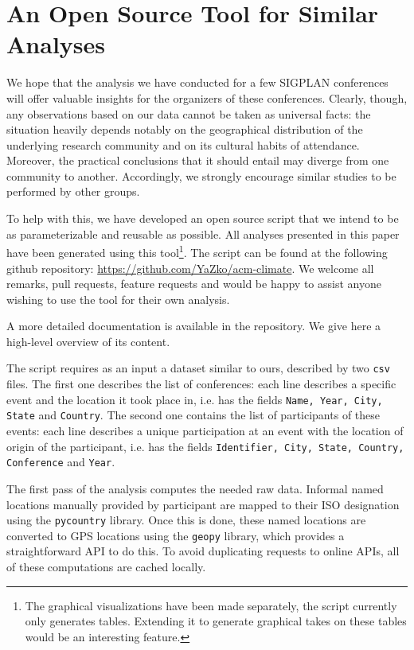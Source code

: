 \section{An Open Source Tool for Similar Analyses}
\label{sec:software}

We hope that the analysis we have conducted for a few SIGPLAN conferences
will offer valuable insights for the organizers of these conferences.
Clearly, though, any observations based on our data cannot be taken as
universal facts: the situation heavily depends notably on the geographical
distribution of the underlying research community and on its cultural habits
of attendance. Moreover, the practical conclusions that it should entail may
diverge from one community to another.  Accordingly, we strongly encourage
similar studies to be performed by other groups.

To help with this, we have developed an open source \python{} script that we
intend to be as parameterizable and reusable as possible. All analyses
presented in 
this paper have been generated using this tool\footnote{The graphical
  visualizations have been made separately, the script currently only generates
  tables. Extending it to generate graphical takes on these tables would be an
  interesting feature.}. The script can be found at the following github repository:
\url{https://github.com/YaZko/acm-climate}.
We welcome all remarks, pull requests, feature requests and would be happy to assist
anyone wishing to use the tool for their own analysis.

A more detailed documentation is available in the repository. We give here a high-level overview
of its content.

The script requires as an input a dataset similar to ours, described by two
\texttt{csv} files. The first one describes the list of conferences: each line
describes a specific event and the location it took place in, i.e. has the
fields \texttt{Name, Year, City, State} and \texttt{Country}. The second one
contains the list of participants of these events: each line describes a unique
participation at an event with the location of origin of the participant, i.e.
has the fields \texttt{Identifier, City, State, Country, Conference} and
\texttt{Year}.

The first pass of the analysis computes the needed raw data.  Informal named
locations manually provided by participant are mapped to their ISO
designation using the \texttt{pycountry} library.  Once this is done, these
named locations are converted to GPS locations using the \texttt{geopy}
library, which provides a straightforward API to do this.  To avoid
duplicating requests to online APIs, all of these computations are cached
locally.

